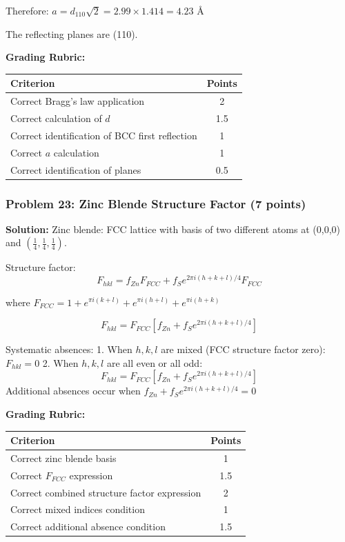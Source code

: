 \documentclass[12pt,a4paper]{article}
\begin{document}
Therefore: $a = d_{110}\sqrt{2} = 2.99 \times 1.414 = 4.23 \text{ \AA}$

The reflecting planes are (110).

\textbf{Grading Rubric:}
\begin{table}[h]
\centering
\begin{tabular}{|p{10cm}|c|}
\hline
\textbf{Criterion} & \textbf{Points} \\
\hline
Correct Bragg's law application & 2 \\
Correct calculation of $d$ & 1.5 \\
Correct identification of BCC first reflection & 1 \\
Correct $a$ calculation & 1 \\
Correct identification of planes & 0.5 \\
\hline
\end{tabular}
\end{table}

\subsubsection*{Problem 23: Zinc Blende Structure Factor (7 points)}
\textbf{Solution:}
Zinc blende: FCC lattice with basis of two different atoms at (0,0,0) and $(\frac{1}{4}, \frac{1}{4}, \frac{1}{4})$.

Structure factor:
\[F_{hkl} = f_{Zn}F_{FCC} + f_S e^{2\pi i(h+k+l)/4}F_{FCC}\]

where $F_{FCC} = 1 + e^{\pi i(k+l)} + e^{\pi i(h+l)} + e^{\pi i(h+k)}$

\[F_{hkl} = F_{FCC}[f_{Zn} + f_S e^{2\pi i(h+k+l)/4}]\]

Systematic absences:
1. When $h,k,l$ are mixed (FCC structure factor zero): $F_{hkl} = 0$
2. When $h,k,l$ are all even or all odd:
   \[F_{hkl} = F_{FCC}[f_{Zn} + f_S e^{2\pi i(h+k+l)/4}]\]
   Additional absences occur when $f_{Zn} + f_S e^{2\pi i(h+k+l)/4} = 0$

\textbf{Grading Rubric:}
\begin{table}[h]
\centering
\begin{tabular}{|p{10cm}|c|}
\hline
\textbf{Criterion} & \textbf{Points} \\
\hline
Correct zinc blende basis & 1 \\
Correct $F_{FCC}$ expression & 1.5 \\
Correct combined structure factor expression & 2 \\
Correct mixed indices condition & 1 \\
Correct additional absence condition & 1.5 \\
\hline
\end{tabular}
\end{table}
\end{document}
